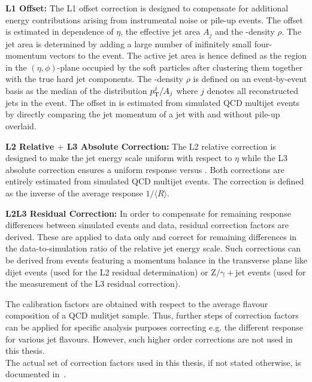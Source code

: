 \begin{description}
 \item \textbf{L1 Offset:} The L1 offset correction is designed to compensate for additional energy contributions arising from instrumental noise or pile-up events. The \pt offset is estimated in dependence of $\eta$, the effective jet area $A_j$ and the \pt-density $\rho$. The jet area is determined by adding a large number of inifinitely small four-momentum vectors to the event. The active jet area is hence defined as the region in the $(\eta, \phi)$-plane occupied by the soft particles after clustering them together with the true hard jet components. The \pt-density $\rho$ is defined on an event-by-event basis as the median of the distribution $p_{\text{T}}^{j}/A_{j}$ where $j$ denotes all reconstructed jets in the event. The offset in \pt is estimated from simulated QCD multijet events by directly comparing the jet momentum of a jet with and without pile-up overlaid.  
 \item \textbf{L2 Relative $+$ L3 Absolute Correction:} The L2 relative correction is designed to make the jet energy scale uniform with respect to $\eta$ while the L3 absolute correction ensures a uniform response versus \pt. Both corrections are entirely estimated from simulated QCD multijet events. The correction is defined as the inverse of the average response $1/\langle R \rangle$.
 \item \textbf{L2L3 Residual Correction:} In order to compensate for remaining response differences between simulated events and data, residual correction factors are derived. These are applied to data only and correct for remaining differences in the data-to-simulation ratio of the relative jet energy scale. Such corrections can be derived from events featuring a momentum balance in the transverse plane like dijet events (used for the L2 residual determination) or $\mathrm{Z/\gamma+jet}$ events (used for the measurement of the L3 residual correction).
\end{description}
The calibration factors are obtained with respect to the average flavour composition of a QCD mulitjet sample. Thus, further steps of correction factors can be applied for specific analysis purposes correcting e.g. the different response for various jet flavours.  However, such higher order corrections are not used in this thesis. \\ 
The actual set of correction factors used in this thesis, if not stated otherwise, is documented in~\cite{CMS-DP-2013-033}.%


